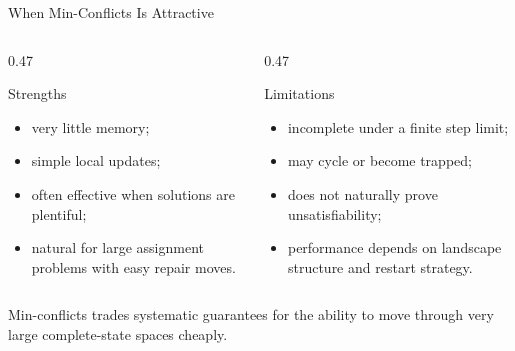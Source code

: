 \documentclass[aspectratio=169,10pt]{beamer}
\begin{document}
\begin{frame}[shrink=20]{When Min-Conflicts Is Attractive}
  \begin{columns}[T,onlytextwidth]
    \begin{column}{0.47\textwidth}
      \begin{block}{Strengths}
        \begin{itemize}
          \item very little memory;
          \item simple local updates;
          \item often effective when solutions are plentiful;
          \item natural for large assignment problems with easy repair moves.
        \end{itemize}
      \end{block}
    \end{column}

    \begin{column}{0.47\textwidth}
      \begin{block}{Limitations}
        \begin{itemize}
          \item incomplete under a finite step limit;
          \item may cycle or become trapped;
          \item does not naturally prove unsatisfiability;
          \item performance depends on landscape structure and restart strategy.
        \end{itemize}
      \end{block}
    \end{column}
  \end{columns}

  \begin{keyidea}
    Min-conflicts trades systematic guarantees for the ability to move through very large complete-state spaces cheaply.
  \end{keyidea}
\end{frame}
\end{document}

